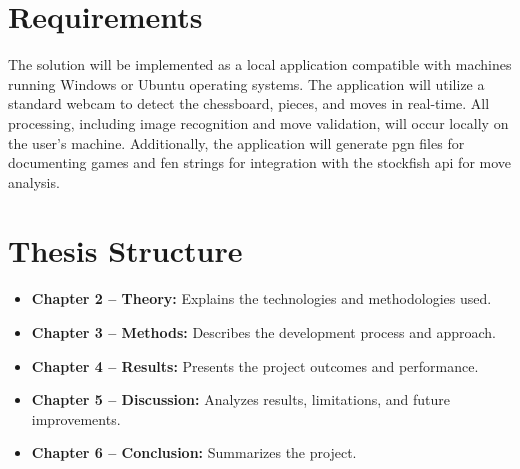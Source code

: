 \section{Requirements}

The solution will be implemented as a local application compatible with machines running Windows or Ubuntu operating systems. The application will utilize a standard webcam to detect the chessboard, pieces, and moves in real-time. All processing, including image recognition and move validation, will occur locally on the user's machine. Additionally, the application will generate \gls{pgn} files for documenting games and \gls{fen} strings for integration with the \gls{stockfish} \gls{api} for move analysis.





\section{Thesis Structure}

\begin{itemize}
    
    \item \textbf{Chapter 2 -- Theory:} Explains the technologies and methodologies used.
    
    \item \textbf{Chapter 3 -- Methods:} Describes the development process and approach.
    
    \item \textbf{Chapter 4 -- Results:} Presents the project outcomes and performance.
    
    \item \textbf{Chapter 5 -- Discussion:} Analyzes results, limitations, and future improvements.
    
    \item \textbf{Chapter 6 -- Conclusion:} Summarizes the project.
\end{itemize}